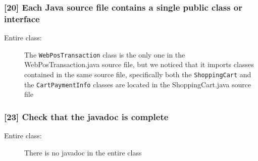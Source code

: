 \subsubsection*{[20] Each Java source file contains a single public class or interface}
\begin{description}
	\item[Entire class:] The {\tt WebPosTransaction} class is the only one in the WebPosTransaction.java source file, but we noticed that it imports classes contained in the same source file, specifically both the {\tt ShoppingCart} and the {\tt CartPaymentInfo} classes are located in the ShoppingCart.java source file
\end{description}

\subsubsection*{[23] Check that the javadoc is complete}
\begin{description}
	\item[Entire class:] There is no javadoc in the entire class
\end{description}


